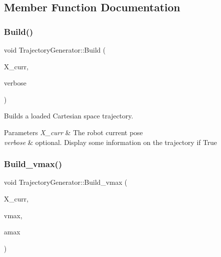 \subsection{Member Function Documentation}
\mbox{\label{class_trajectory_generator_ae74c9669e7b82cbd16d717b67a67bfab}} 
\subsubsection{\texorpdfstring{Build()}{Build()}}
{\footnotesize\ttfamily void Trajectory\+Generator\+::\+Build (\begin{DoxyParamCaption}\item[{K\+D\+L\+::\+Frame \&}]{X\+\_\+curr,  }\item[{bool}]{verbose }\end{DoxyParamCaption})}



Builds a loaded Cartesian space trajectory. 


\begin{DoxyParams}{Parameters}
{\em X\+\_\+curr} & The robot current pose \\
\hline
{\em verbose} & optional. Display some information on the trajectory if True \\
\hline
\end{DoxyParams}
\mbox{\label{class_trajectory_generator_a3a2299cadddd64978bd4cf3261df2c6d}} 
\subsubsection{\texorpdfstring{Build\+\_\+vmax()}{Build\_vmax()}}
{\footnotesize\ttfamily void Trajectory\+Generator\+::\+Build\+\_\+vmax (\begin{DoxyParamCaption}\item[{K\+D\+L\+::\+Frame \&}]{X\+\_\+curr,  }\item[{double}]{vmax,  }\item[{double}]{amax }\end{DoxyParamCaption})}



